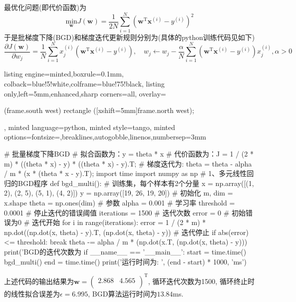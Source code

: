 \documentclass{article}
\begin{document}
\begin{homeworkProblem}
	\solution 最优化问题(即代价函数)为$$\displaystyle \underset{\boldsymbol{w}}{\text{min}}J\left( \boldsymbol{w} \right) = \frac{1}{2N} \sum_{i=1}^N{\left( \boldsymbol{w}^{\text{T}}\boldsymbol{x}^{\left( i \right)}-y^{\left( i \right)} \right) ^2}	$$
	于是批梯度下降(BGD)和梯度迭代更新规则分别为(具体的python训练代码见如下)
	$$
	\frac{\partial J\left( \boldsymbol{w} \right)}{\partial w_j}=\frac{1}{N}\sum_{i=1}^N{x_{j}^{\left( i \right)}\left( \boldsymbol{w}^{\text{T}}\boldsymbol{x}^{\left( i \right)}-y^{\left( i \right)} \right)},\quad w_j\gets w_j-\frac{\alpha}{N} \sum_{i=1}^N{\left( \boldsymbol{w}^{\text{T}}\boldsymbol{x}^{\left( i \right)}-y^{\left( i \right)} \right) x_{j}^{\left( i \right)}},\alpha >0
	$$
\begin{tcblisting}{listing engine=minted,boxrule=0.1mm,
colback=blue!5!white,colframe=blue!75!black,
listing only,left=5mm,enhanced,sharp corners=all,
overlay={\begin{tcbclipinterior} (frame.south west)
rectangle ([xshift=5mm]frame.north west);\end{tcbclipinterior}},
minted language=python,
minted style=tango,
minted options={fontsize=\small,breaklines,autogobble,linenos,numbersep=3mm}}
# 批量梯度下降BGD
# 拟合函数为：y = theta * x
# 代价函数为：J = 1 / (2 * m) * ((theta * x) - y) * ((theta * x) - y).T;
# 梯度迭代为: theta = theta - alpha / m * (x * (theta * x - y).T);
import time
import numpy as np
# 1、多元线性回归的BGD程序
def bgd_multi():
    # 训练集，每个样本有2个分量
    x = np.array([(1, 2), (2, 5), (5, 1), (4, 2)])
    y = np.array([19, 26, 19, 20])
    # 初始化
    m, dim = x.shape
    theta = np.ones(dim)  # 参数
    alpha = 0.001  # 学习率
    threshold = 0.0001  # 停止迭代的错误阈值
    iterations = 1500  # 迭代次数
    error = 0  # 初始错误为0
    # 迭代开始
    for i in range(iterations):
        error = 1 / (2 * m) * np.dot((np.dot(x, theta) - y).T, (np.dot(x, theta) - y))
        # 迭代停止
        if abs(error) <= threshold:
            break
        theta -= alpha / m * (np.dot(x.T, (np.dot(x, theta) - y)))
    print('BGD的迭代次数为%
if __name__ == '__main__':
    start = time.time()
    bgd_multi()
    end = time.time()
    print('运行时间为: ', (end - start) * 1000, 'ms')
\end{tcblisting}
	上述代码的输出结果为$\boldsymbol{w}=\left( \begin{matrix}
		2.868&		4.565\\
	\end{matrix} \right) ^{\text{T}}$, 循环迭代次数为1500, 循环终止时的线性拟合误差为$\epsilon = 6.995$, BGD算法运行时间为$13.84$ms.


\end{homeworkProblem}
\end{document}
